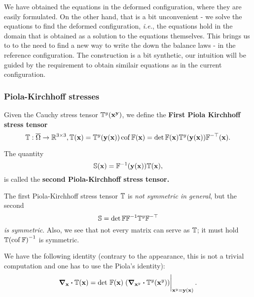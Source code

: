 \documentclass[11pt]{scrartcl} %
\begin{document}
We have obtained the equations in the deformed configuration, where they are easily formulated. On the other hand, that is a bit unconvenient - we solve the equations to find the deformed configuration, \textit{i.e.}, the equations hold in the domain that is obtained as a solution to the equations themselves. This brings us to to the need to find a new way to write the down the balance laws - in the reference configuration. The construction is a bit synthetic, our intuition will be guided by the requirement to obtain similair equations as in the current configuration.

\subsubsection{Piola-Kirchhoff stresses}
\label{sec:pkstresses}

\begin{definition}
Given the Cauchy stress tensor $\mathbb{T}^y(\vb{x^y})$, we define the \textbf{First Piola Kirchhoff stress tensor}
\[
	\mathbb{T}: \overline{\Omega} \to {\mathbb R}^{3 \times 3}, \mathbb{T}(\vb{x}) = \mathbb{T}^y(\vb{y}\qty(\vb{x})) \operatorname{cof} \mathbb{F} (\vb{x}) = \det \mathbb{F} (\vb{x}) \mathbb{T}^y(\vb{y}\qty(\vb{x})) \mathbb{F}^{-\top}(\vb{x}).
\]
\end{definition}

\begin{definition}
The quantity
	\[
		\mathbb{S}(\vb{x}) = \mathbb{F}^{-1}\qty(\vb{y}\qty(\vb{x})) \mathbb{T}(\vb{x}),
	\]
	is called the \textbf{second Piola-Kirchhoff stress tensor.}
\end{definition}

\begin{remark}
	The first Piola-Kirchhoff stress tensor $\mathbb{T}$ is \textit{not symmetric in general}, but the second
	\[
		\mathbb{S} =  \det \mathbb{F} \mathbb{F}^{-1} \mathbb{T}^y \mathbb{F}^{-\top}
	\]
	\textit{is symmetric}. Also, we see that not every matrix can serve as $\mathbb{T}$; it must hold $\mathbb{T} \qty(\operatorname{cof} \mathbb{F})^{-1}$ is symmetric.
\end{remark}

\begin{remark}
We have the following identity (contrary to the appearance, this is not a trivial computation and one has to use the Piola's identity):
\begin{equation}
	\label{eq:piola_identity}
	\grad_{\vb{x}} \vdot \pkstress\qty(\vb{x}) = \detf\qty(\vb{x}) \eval{\qty(\grad_{\vb{x}^{y}} \vdot \cstress\qty(\vb{x}^{y}))}_{\vb{x}^{y} = \vb{y}\qty(\vb{x})}.
\end{equation}
\end{remark}
\end{document}
